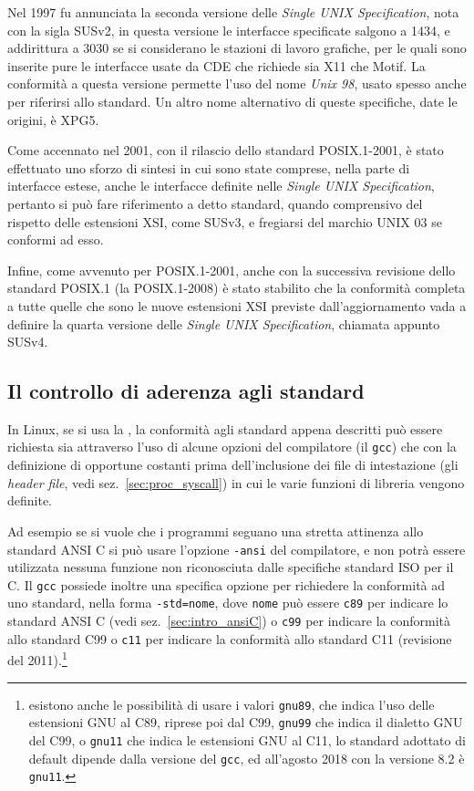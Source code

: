 Nel 1997 fu annunciata la seconda versione delle \textit{Single UNIX
  Specification}, nota con la sigla SUSv2, in questa versione le interfacce
specificate salgono a 1434, e addirittura a 3030 se si considerano le stazioni
di lavoro grafiche, per le quali sono inserite pure le interfacce usate da CDE
che richiede sia X11 che Motif. La conformità a questa versione permette l'uso
del nome \textit{Unix 98}, usato spesso anche per riferirsi allo standard. Un
altro nome alternativo di queste specifiche, date le origini, è XPG5.

Come accennato nel 2001, con il rilascio dello standard POSIX.1-2001, è stato
effettuato uno sforzo di sintesi in cui sono state comprese, nella parte di
interfacce estese, anche le interfacce definite nelle \textit{Single UNIX
  Specification}, pertanto si può fare riferimento a detto standard, quando
comprensivo del rispetto delle estensioni XSI, come SUSv3, e fregiarsi del
marchio UNIX 03 se conformi ad esso. 

Infine, come avvenuto per POSIX.1-2001, anche con la successiva revisione
dello standard POSIX.1 (la POSIX.1-2008) è stato stabilito che la conformità
completa a tutte quelle che sono le nuove estensioni XSI previste
dall'aggiornamento vada a definire la quarta versione delle \textit{Single
  UNIX Specification}, chiamata appunto SUSv4.


\subsection{Il controllo di aderenza agli standard}
\label{sec:intro_gcc_glibc_std}

In Linux, se si usa la , la conformità agli standard appena
descritti può essere richiesta sia attraverso l'uso di alcune opzioni del
compilatore (il \texttt{gcc}) che con la definizione di opportune costanti
prima dell'inclusione dei file di intestazione (gli \textit{header file}, vedi
sez.~\ref{sec:proc_syscall}) in cui le varie funzioni di libreria vengono
definite.

Ad esempio se si vuole che i programmi seguano una stretta attinenza allo
standard ANSI C si può usare l'opzione \texttt{-ansi} del compilatore, e non
potrà essere utilizzata nessuna funzione non riconosciuta dalle specifiche
standard ISO per il C.  Il \texttt{gcc} possiede inoltre una specifica opzione
per richiedere la conformità ad uno standard, nella forma \texttt{-std=nome},
dove \texttt{nome} può essere \texttt{c89} per indicare lo standard ANSI C
(vedi sez.~\ref{sec:intro_ansiC}) o \texttt{c99} per indicare la conformità
allo standard C99 o \texttt{c11} per indicare la conformità allo standard C11
(revisione del 2011).\footnote{esistono anche le possibilità di usare i valori
  \texttt{gnu89}, che indica l'uso delle estensioni GNU al C89, riprese poi
  dal C99, \texttt{gnu99} che indica il dialetto GNU del C99, o \texttt{gnu11}
  che indica le estensioni GNU al C11, lo standard adottato di default dipende
  dalla versione del \texttt{gcc}, ed all'agosto 2018 con la versione 8.2 è
  \texttt{gnu11}.}

